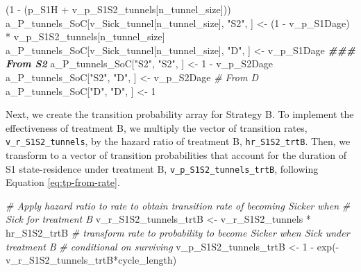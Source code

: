\documentclass[
]{article}
\newenvironment{Shaded}{\begin{snugshade}}{\end{snugshade}}
\newcommand{\CommentTok}[1]{\textcolor[rgb]{0.56,0.35,0.01}{\textit{#1}}}
\newcommand{\DecValTok}[1]{\textcolor[rgb]{0.00,0.00,0.81}{#1}}
\newcommand{\DocumentationTok}[1]{\textcolor[rgb]{0.56,0.35,0.01}{\textbf{\textit{#1}}}}
\newcommand{\FunctionTok}[1]{\textcolor[rgb]{0.00,0.00,0.00}{#1}}
\newcommand{\NormalTok}[1]{#1}
\newcommand{\OtherTok}[1]{\textcolor[rgb]{0.56,0.35,0.01}{#1}}
\newcommand{\SpecialCharTok}[1]{\textcolor[rgb]{0.00,0.00,0.00}{#1}}
\newcommand{\StringTok}[1]{\textcolor[rgb]{0.31,0.60,0.02}{#1}}
\begin{document}
\begin{Shaded}
\begin{Highlighting}[]
\NormalTok{                                                   (}\DecValTok{1} \SpecialCharTok{{-}}\NormalTok{ (p\_S1H }\SpecialCharTok{+}\NormalTok{ v\_p\_S1S2\_tunnels[n\_tunnel\_size]))}
\NormalTok{a\_P\_tunnels\_SoC[v\_Sick\_tunnel[n\_tunnel\_size], }\StringTok{"S2"}\NormalTok{, ] }\OtherTok{\textless{}{-}}\NormalTok{ (}\DecValTok{1} \SpecialCharTok{{-}}\NormalTok{ v\_p\_S1Dage) }\SpecialCharTok{*} 
\NormalTok{                                                     v\_p\_S1S2\_tunnels[n\_tunnel\_size]}
\NormalTok{a\_P\_tunnels\_SoC[v\_Sick\_tunnel[n\_tunnel\_size], }\StringTok{"D"}\NormalTok{, ]  }\OtherTok{\textless{}{-}}\NormalTok{ v\_p\_S1Dage}
\DocumentationTok{\#\#\# From S2}
\NormalTok{a\_P\_tunnels\_SoC[}\StringTok{"S2"}\NormalTok{, }\StringTok{"S2"}\NormalTok{, ] }\OtherTok{\textless{}{-}} \DecValTok{1} \SpecialCharTok{{-}}\NormalTok{ v\_p\_S2Dage}
\NormalTok{a\_P\_tunnels\_SoC[}\StringTok{"S2"}\NormalTok{, }\StringTok{"D"}\NormalTok{, ]  }\OtherTok{\textless{}{-}}\NormalTok{ v\_p\_S2Dage}
\CommentTok{\# From D}
\NormalTok{a\_P\_tunnels\_SoC[}\StringTok{"D"}\NormalTok{, }\StringTok{"D"}\NormalTok{, ] }\OtherTok{\textless{}{-}} \DecValTok{1}
\end{Highlighting}
\end{Shaded}

Next, we create the transition probability array for Strategy B. To implement the effectiveness of treatment B, we multiply the vector of transition rates, \texttt{v\_r\_S1S2\_tunnels}, by the hazard ratio of treatment B, \texttt{hr\_S1S2\_trtB}. Then, we transform to a vector of transition probabilities that account for the duration of S1 state-residence under treatment B, \texttt{v\_p\_S1S2\_tunnels\_trtB}, following Equation \eqref{eq:tp-from-rate}.

\begin{Shaded}
\begin{Highlighting}[]
\CommentTok{\# Apply hazard ratio to rate to obtain transition rate of becoming Sicker when }
\CommentTok{\# Sick for treatment B}
\NormalTok{v\_r\_S1S2\_tunnels\_trtB }\OtherTok{\textless{}{-}}\NormalTok{ v\_r\_S1S2\_tunnels }\SpecialCharTok{*}\NormalTok{ hr\_S1S2\_trtB}
\CommentTok{\# transform rate to probability to become Sicker when Sick under treatment B }
\CommentTok{\# conditional on surviving}
\NormalTok{v\_p\_S1S2\_tunnels\_trtB }\OtherTok{\textless{}{-}} \DecValTok{1} \SpecialCharTok{{-}} \FunctionTok{exp}\NormalTok{(}\SpecialCharTok{{-}}\NormalTok{v\_r\_S1S2\_tunnels\_trtB}\SpecialCharTok{*}\NormalTok{cycle\_length) }
\end{Highlighting}
\end{Shaded}
\end{document}
